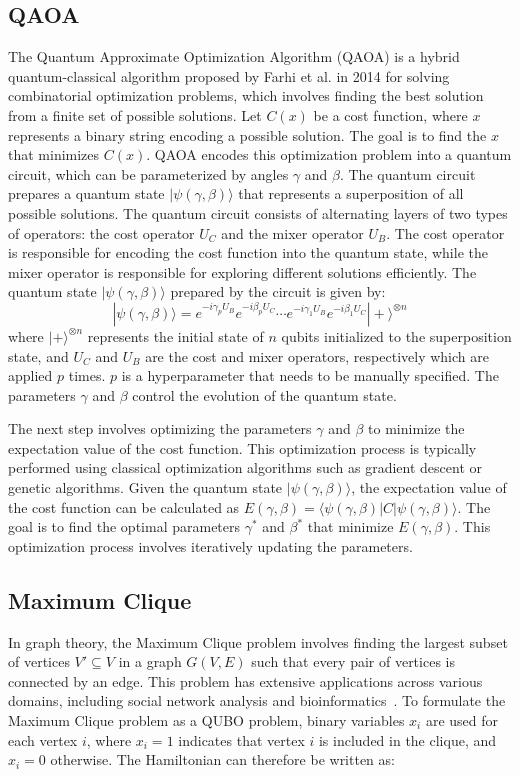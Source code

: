 \documentclass[conference]{IEEEtran}
\theoremstyle{plain}
\theoremstyle{definition}
\theoremstyle{remark}
\begin{document}
\subsection{QAOA}
The Quantum Approximate Optimization Algorithm (QAOA) is a hybrid quantum-classical algorithm proposed by Farhi et al. in 2014\cite{farhi2014quantum} for solving combinatorial optimization problems, which involves finding the best solution from a finite set of possible solutions. Let $C(x)$ be a cost function, where $x$ represents a binary string encoding a possible solution. The goal is to find the $x$ that minimizes $C(x)$. QAOA encodes this optimization problem into a quantum circuit, which can be parameterized by angles $\gamma$ and $\beta$. The quantum circuit prepares a quantum state $|\psi(\gamma, \beta)\rangle$ that represents a superposition of all possible solutions. The quantum circuit consists of alternating layers of two types of operators: the cost operator $U_C$ and the mixer operator $U_B$. The cost operator is responsible for encoding the cost function into the quantum state, while the mixer operator is responsible for exploring different solutions efficiently. The quantum state $|\psi(\gamma, \beta)\rangle$ prepared by the circuit is given by:
\[
|\psi(\gamma, \beta)\rangle = e^{-i\gamma_p U_B}e^{-i\beta_p U_C} \cdots e^{-i\gamma_1 U_B}e^{-i\beta_1 U_C}|+\rangle^{\otimes n}
\]
where $|+\rangle^{\otimes n}$ represents the initial state of $n$ qubits initialized to the superposition state, and $U_C$ and $U_B$ are the cost and mixer operators, respectively which are applied $p$ times. $p$ is a hyperparameter that needs to be manually specified. The parameters $\gamma$ and $\beta$ control the evolution of the quantum state.

The next step involves optimizing the parameters  $\gamma$ and $\beta$ to minimize the expectation value of the cost function. This optimization process is typically performed using classical optimization algorithms such as gradient descent or genetic algorithms. Given the quantum state $|\psi(\gamma, \beta)\rangle$, the expectation value of the cost function can be calculated as $E(\gamma, \beta) = \langle \psi(\gamma, \beta) | C | \psi(\gamma, \beta) \rangle
$. The goal is to find the optimal parameters $\gamma^*$ and $\beta^*$ that minimize $E(\gamma, \beta)$. This optimization process involves iteratively updating the parameters.

\subsection{Maximum Clique}
In graph theory, the Maximum Clique problem involves finding the largest subset of vertices $V' \subseteq V$ in a graph $G(V,E)$ such that every pair of vertices is connected by an edge. This problem has extensive applications across various domains, including social network analysis and bioinformatics~\cite{eblen2011maximum, rossi2015parallel}. To formulate the Maximum Clique problem as a QUBO problem, binary variables $x_i$ are used for each vertex $i$, where $x_i = 1$ indicates that vertex $i$ is included in the clique, and $x_i = 0$ otherwise. The Hamiltonian can therefore be written as:
\end{document}
